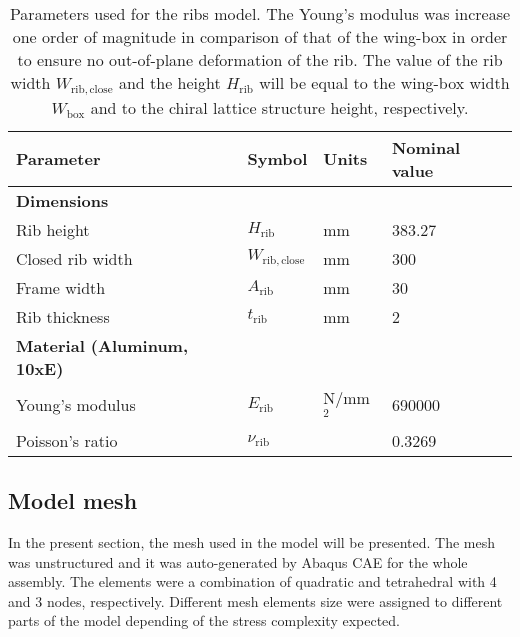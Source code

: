 \begin{table}[!htpb]
\centering
\begin{tabular}{|l|lll|}
\hline
\textbf{Parameter} & \multicolumn{1}{l|}{\textbf{Symbol}} & \multicolumn{1}{l|}{\textbf{Units}} & \textbf{Nominal value} \\ \hline \hline
{\textbf{Dimensions}} &  &  &  \\ \hline
Rib height & \multicolumn{1}{l|}{$H_{\mathrm{rib}}$} & \multicolumn{1}{l|}{mm} & 383.27 \\ \hline
Closed rib width & \multicolumn{1}{l|}{$W_{\mathrm{rib,close}}$} & \multicolumn{1}{l|}{mm} & 300 \\ \hline
Frame width & \multicolumn{1}{l|}{$A_{\mathrm{rib}}$} & \multicolumn{1}{l|}{mm} & 30 \\ \hline
Rib thickness & \multicolumn{1}{l|}{$t_{\mathrm{rib}}$} & \multicolumn{1}{l|}{mm} & 2 \\ \hline \hline
{\textbf{Material (Aluminum, 10xE)}} &  &  &  \\ \hline
Young's modulus & \multicolumn{1}{l|}{$E_{\mathrm{rib}}$} & \multicolumn{1}{l|}{N/mm$^2$} & 690000 \\ \hline
Poisson's ratio & \multicolumn{1}{l|}{$\nu_{\mathrm{rib}}$} & \multicolumn{1}{l|}{} & 0.3269 \\ \hline
\end{tabular}
\caption[Parameters used for the ribs model]{Parameters used for the ribs model. The Young's modulus was increase one order of magnitude in comparison of that of the wing-box in order to ensure no out-of-plane deformation of the rib. The value of the rib width $W_{\mathrm{rib,close}}$ and the height $H_{\mathrm{rib}}$ will be equal to the wing-box width $W_{\mathrm{box}}$ and to the chiral lattice structure height, respectively.}
\label{tab:parameters_rib}
\end{table}

\clearpage
\subsection{Model mesh} \label{subsec:mesh_computationalModel}

In the present section, the mesh used in the model will be presented. The mesh was unstructured and it was auto-generated by Abaqus CAE for the whole assembly. The elements were a combination of quadratic and tetrahedral with 4 and 3 nodes, respectively. Different mesh elements size were assigned to different parts of the model depending of the stress complexity expected. 

